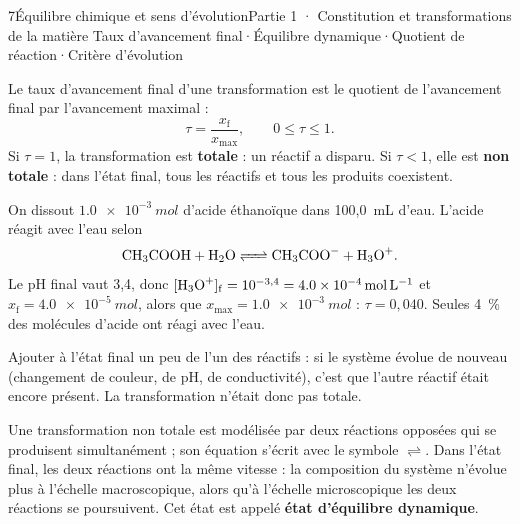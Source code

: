 \begin{ouverture}[equilibre]{7}{Équilibre chimique et sens d'évolution}{Partie 1 · Constitution et transformations de la matière}
{Taux d'avancement final\enspace·\enspace Équilibre dynamique\enspace·\enspace Quotient de réaction\enspace·\enspace Critère d'évolution}
\end{ouverture}
\essentiel
{}
\begin{definition}
Le taux d'avancement final d'une transformation est le quotient de l'avancement final par l'avancement maximal :
\[\tau=\frac{x_\mathrm{f}}{x_{\max}},\qquad 0\leq\tau\leq1.\]
Si $\tau=1$, la transformation est \textbf{totale} : un réactif a disparu. Si $\tau<1$, elle est \textbf{non totale} :
dans l'état final, tous les réactifs et tous les produits coexistent.
\end{definition}
\begin{exemple}
On dissout $\qty{1,0e-3}{mol}$ d'acide éthanoïque dans 100,0~mL d'eau. L'acide réagit avec l'eau selon
\[\ce{CH3COOH + H2O <=> CH3COO- + H3O+}.\]
Le pH final vaut 3,4, donc $[\ce{H3O+}]_\mathrm{f}=10^{-3{,}4}=\qty{4,0e-4}{mol.L^{-1}}$ et $x_\mathrm{f}=\qty{4,0e-5}{mol}$,
alors que $x_{\max}=\qty{1,0e-3}{mol}$ : $\tau=0{,}040$. Seules 4~\% des molécules d'acide ont réagi avec l'eau.
\end{exemple}
\begin{savoirfaire}
Ajouter à l'état final un peu de l'un des réactifs : si le système évolue de nouveau (changement de couleur, de pH,
de conductivité), c'est que l'autre réactif était encore présent. La transformation n'était donc pas totale.
\end{savoirfaire}
\begin{definition}
Une transformation non totale est modélisée par deux réactions opposées qui se produisent simultanément ; son
équation s'écrit avec le symbole $\rightleftharpoons$. Dans l'état final, les deux réactions ont la même vitesse : la composition
du système n'évolue plus à l'échelle macroscopique, alors qu'à l'échelle microscopique les deux réactions se
poursuivent. Cet état est appelé \textbf{état d'équilibre dynamique}.
\end{definition}
